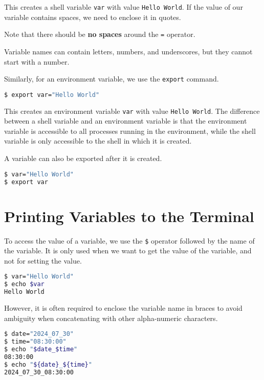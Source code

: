 This creates a shell variable \lstinline{var} with value \lstinline{Hello World}.
If the value of our variable contains spaces, we need to enclose it in quotes.

\begin{remark}
Note that there should be \textbf{no spaces} around the \lstinline{=} operator.
\end{remark}

Variable names can contain letters, numbers, and underscores, but they cannot start with a number.

Similarly, for an environment variable, we use the \lstinline{export} command.

\begin{lstlisting}[language=bash]
$ export var="Hello World"
\end{lstlisting}

This creates an environment variable \lstinline{var} with value \lstinline{Hello World}.
The difference between a shell variable and an environment variable is that the environment variable is accessible to all processes running in the environment, while the shell variable is only accessible to the shell in which it is created.

A variable can also be exported after it is created.

\begin{lstlisting}[language=bash]
$ var="Hello World"
$ export var
\end{lstlisting}

\section{Printing Variables to the Terminal}

To access the value of a variable, we use the \lstinline|$| operator followed by the name of the variable.
It is only used when we want to get the value of the variable, and not for setting the value.

\begin{lstlisting}[language=bash]
$ var="Hello World"
$ echo $var
Hello World
\end{lstlisting}

However, it is often required to enclose the variable name in braces to avoid ambiguity when concatenating with other alpha-numeric characters.

\begin{lstlisting}[language=bash]
$ date="2024_07_30"
$ time="08:30:00"
$ echo "$date_$time"
08:30:00
$ echo "${date}_${time}"
2024_07_30_08:30:00
\end{lstlisting}

